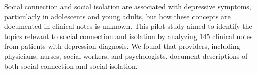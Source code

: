 Social connection and social isolation are associated with depressive symptoms, particularly in adolescents and young adults, but how these concepts are documented in clinical notes is unknown. This pilot study aimed to identify the topics relevant to social connection and isolation by analyzing 145 clinical notes from patients with depression diagnosis. We found that providers, including physicians, nurses, social workers, and psychologists, document descriptions of both social connection and social isolation.
